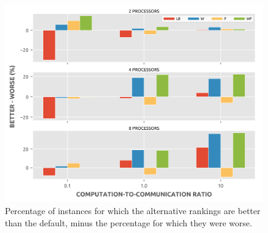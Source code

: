 \documentclass[12pt]{article}
\begin{document}
\begin{figure}
	\centering	
	\includegraphics[scale=0.8]{100tasks_differential.png}
	\caption{Percentage of instances for which the alternative rankings are better than the default, minus the percentage for which they were worse.}	
	\label{plot.rankings_diff_100}
\end{figure}

\end{document}
